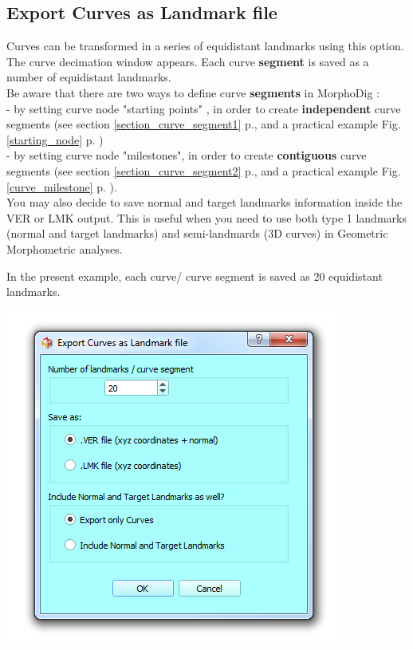 \subsection{Export Curves as Landmark file}
\begin{minipage}{0.55\textwidth}

Curves can be transformed in a series of equidistant landmarks using this option. The curve decimation window
appears.
Each curve \textbf{segment} is saved as a number of
equidistant landmarks.\\
Be aware that there are two ways to define curve \textbf{segments} in MorphoDig : \\
- by setting curve node "starting points" , in order to create \textbf{independent} curve segments (see section \ref{section_curve_segment1} p.\pageref{section_curve_segment1}, and a practical example Fig. \ref{starting_node} p. \pageref{starting_node})\\
- by setting curve node "milestones", in order to create \textbf{contiguous} curve segments (see section \ref{section_curve_segment2} p.\pageref{section_curve_segment2}, and a practical example Fig. \ref{curve_milestone} p. \pageref{curve_milestone}).
\\
 You may also decide to save normal and target landmarks information inside the VER or LMK output. This is useful when you need to use both type 1 landmarks (normal and target landmarks) and semi-landmards (3D curves) in Geometric Morphometric analyses. 

In the present example, each curve/
curve segment is saved as 20 equidistant landmarks.

\end{minipage}  
 \begin{minipage}{0.45\textwidth}\centering
  \includegraphics[scale=0.5]{images/07/curves/export.png}
 \end{minipage} 



